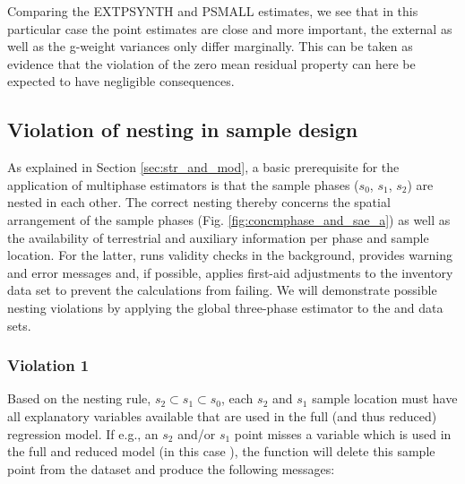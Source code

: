 \documentclass[article]{jss}
\begin{document}
Comparing the EXTPSYNTH and PSMALL estimates, we see that in this particular case the point estimates are close and more important, the external as well as the g-weight variances only differ marginally. This can be taken as evidence that the violation of the zero mean residual property can here be expected to have negligible consequences.

\subsection{Violation of nesting in sample design}

As explained in Section \ref{sec:str_and_mod}, a basic prerequisite for the application of multiphase estimators is that the sample phases ($s_0$, $s_1$, $s_2$) are nested in each other. The correct nesting thereby concerns the spatial arrangement of the sample phases (Fig. \ref{fig:concmphase_and_sae_a}) as well as the availability of terrestrial and auxiliary information per phase and sample location. For the latter,  runs validity checks in the background, provides warning and error messages and, if possible, applies first-aid adjustments to the inventory data set to prevent the calculations from failing. We will demonstrate possible nesting violations by applying the global three-phase estimator to the  and  data sets.

\subsubsection*{Violation 1}

Based on the nesting rule, $s_2 \subset s_1 \subset s_0$, each $s_2$ and $s_1$ sample location must have all explanatory variables available that are used in the full (and thus reduced) regression model. If e.g., an $s_2$ and/or $s_1$ point misses a variable which is used in the full and reduced model (in this case ), the function will delete this sample point from the dataset and produce the following messages:  


\begin{Schunk}
\end{Schunk}
\end{document}
